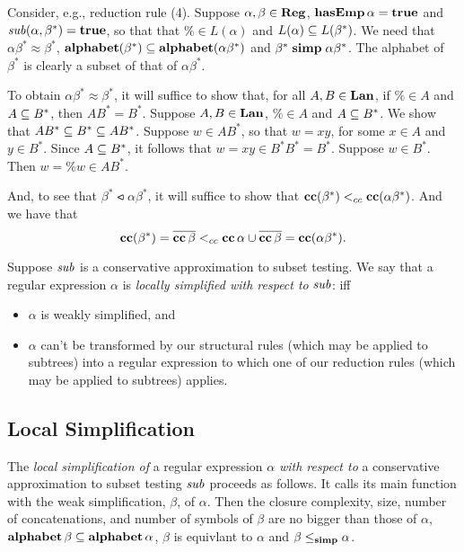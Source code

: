 Consider, e.g., reduction rule (4). Suppose $\alpha, \beta\in\mathbf{Reg}$,
$\mathbf{hasEmp}\,\alpha=\mathbf{true}$ and ${\it sub}(\alpha,\beta^*)=\mathbf{true}$, so that that
$\%\in L(\alpha)$ and $L(\alpha)\subseteq L(\beta^*)$.  We need that
$\alpha\beta^* \approx \beta^*$,
$\mathbf{alphabet}(\beta^*)\subseteq\mathbf{alphabet}(\alpha\beta^*)$ and
$\beta^*\mathrel{\mathbf{simp}}\alpha\beta^*$.  The alphabet of $\beta^*$ is clearly a
subset of that of $\alpha\beta^*$.

To obtain $\alpha\beta^* \approx \beta^*$, it will suffice to show
that, for all $A,B\in\mathbf{Lan}$, if $\%\in A$ and $A\subseteq B^*$, then
$AB^*=B^*$.  Suppose $A,B\in\mathbf{Lan}$, $\%\in A$ and $A\subseteq B^*$.
We show that $AB^*\subseteq B^*\subseteq AB^*$.  Suppose $w\in AB^*$, so
that $w=xy$, for some $x\in A$ and $y\in B^*$.  Since $A\subseteq B^*$,
it follows that $w=xy\in B^*B^*=B^*$.  Suppose $w\in B^*$.
Then $w=\%w\in AB^*$.

And, to see that $\beta^*\ltcc\alpha\beta^*$, it will suffice to
show that $\mathbf{cc}(\beta^*)\mathrel{<_{cc}}\mathbf{cc}(\alpha\beta^*)$.  And we
have that
\begin{displaymath}
 \mathbf{cc}(\beta^*) = \overline{\mathbf{cc}\,\beta} \mathrel{<_{cc}}
 \mathbf{cc}\,\alpha \cup \overline{\mathbf{cc}\,\beta} = \mathbf{cc}(\alpha\beta^*) .
\end{displaymath}

Suppose ${\it sub}$ is a conservative approximation to subset testing.
%
We say that a regular expression $\alpha$ is \emph{locally simplified with
respect to} ${\it sub}$:
iff
\begin{itemize}
\item $\alpha$ is weakly simplified, and

\item $\alpha$ can't be transformed by our structural rules (which may
  be applied to subtrees) into a regular expression to which one of
  our reduction rules (which may be applied to subtrees) applies.
\end{itemize}

\subsection*{Local Simplification}

%
%
The \emph{local simplification of} a regular expression $\alpha$
\emph{with respect to} a conservative approximation to subset testing
${\it sub}$ proceeds as follows.  It calls its main function with the weak
simplification, $\beta$, of $\alpha$. Then the closure complexity,
size, number of concatenations, and number of symbols of $\beta$ are
no bigger than those of $\alpha$,
$\mathbf{alphabet}\,\beta\subseteq\mathbf{alphabet}\,\alpha$,
$\beta$ is equivlant to $\alpha$ and $\beta\mathrel{\leq_{\mathbf{simp}}}\alpha$.


